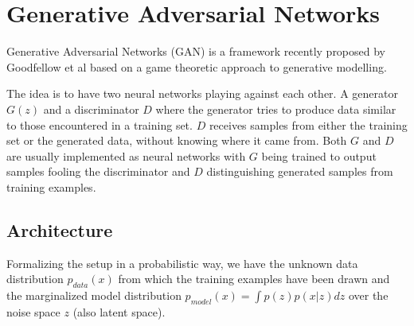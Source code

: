 \section{Generative Adversarial Networks}
\label{sec:gan}

Generative Adversarial Networks (GAN) is a framework recently proposed by Goodfellow et al based on a game theoretic approach to generative modelling.

The idea is to have two neural networks playing against each other.
A generator $G(z)$ and a discriminator $D$ where the generator tries to produce data similar to those encountered in a training set. $D$ receives samples from either the training set or the generated data, without knowing where it came from.
Both $G$ and $D$ are usually implemented as neural networks with $G$ being trained to output samples fooling the discriminator and $D$ distinguishing generated samples from training examples.







\subsection{Architecture}
\label{sub:gan_arch}
Formalizing the setup in a probabilistic way, we have the unknown data distribution $p_{data}(x)$ from which the training examples have been drawn and the marginalized model distribution $p_{model}(x) = \int p(z)p(x|z) \textit{d}z$ over the noise space $z$ (also latent space).


